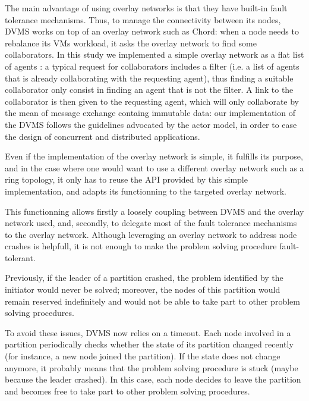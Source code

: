 The main advantage of using overlay networks is that they have built-in fault
tolerance mechanisms. Thus, to manage the connectivity between its nodes, DVMS
works on top of an overlay network such as Chord: when a node needs to rebalance
its VMs workload, it asks the overlay network to find some
collaborators. In this study we implemented a simple overlay network as a flat 
list of agents : a typical request for collaborators includes a filter (i.e. a 
list of agents that is already collaborating with the requesting agent), thus 
finding a suitable collaborator only consist in finding an agent that is not the 
filter. A link to the collaborator is then given to the requesting agent, which 
will only collaborate by the mean of message exchange containg immutable data: 
our implementation of the DVMS follows the guidelines advocated by the actor 
model, in order to ease the design of concurrent and distributed applications. 

Even if the implementation of the overlay network is simple, it fulfills its 
purpose, and in the case where one would want to use a different overlay network
such as a ring topology, it only has to reuse the API provided by this simple 
implementation, and adapts its functionning to the targeted overlay network. 


This functionning allows firstly a loosely coupling between DVMS and the overlay
network used, and, secondly, to delegate most of the fault tolerance mechanisms
to the overlay network. Although leveraging an overlay network to address node 
crashes is helpfull, it is not enough to make the problem solving procedure 
fault-tolerant.

Previously, if the leader of a partition crashed, the problem identified by the
initiator would never be solved; moreover, the nodes of this partition would
remain reserved indefinitely and would not be able to take part to other problem
solving procedures.

To avoid these issues, DVMS now relies on a timeout.  Each node involved in a
partition periodically checks whether the state of its partition changed
recently (for instance, a new node joined the partition).
%
If the state does not change anymore, it probably means that the problem solving
procedure is stuck (maybe because the leader crashed).
%
In this case, each node decides to leave the partition and becomes free to take
part to other problem solving procedures.

